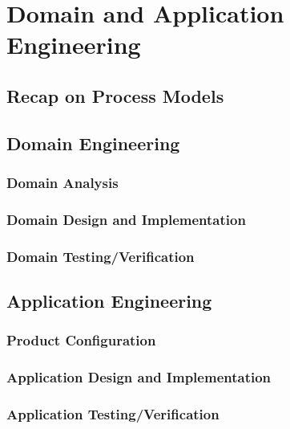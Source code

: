

\subtitle{8. Development Process}
\author{Thomas Thüm}





\section{Domain and Application Engineering}

\subsection{Recap on Process Models}
\subsection{Domain Engineering}
\subsubsection{Domain Analysis}
\subsubsection{Domain Design and Implementation}
\subsubsection{Domain Testing/Verification}
\subsection{Application Engineering}
\subsubsection{Product Configuration}
\subsubsection{Application Design and Implementation}
\subsubsection{Application Testing/Verification}
